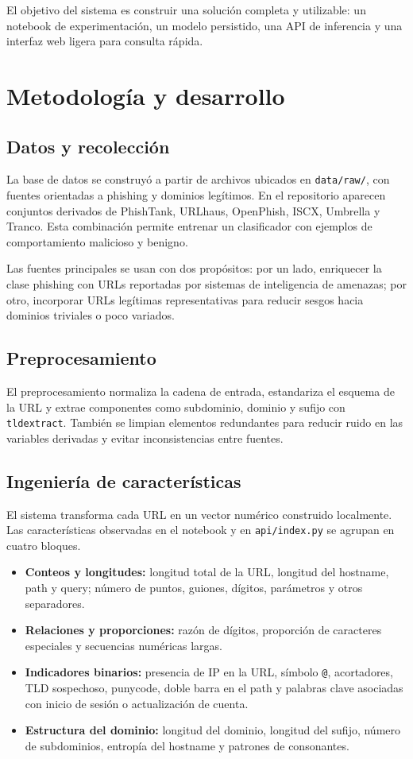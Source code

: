 \documentclass[conference]{IEEEtran}
\begin{document}
El objetivo del sistema es construir una solución completa y utilizable: un notebook de experimentación, un modelo persistido, una API de inferencia y una interfaz web ligera para consulta rápida.

\section{Metodología y desarrollo}
\subsection{Datos y recolección}
La base de datos se construyó a partir de archivos ubicados en \texttt{data/raw/}, con fuentes orientadas a phishing y dominios legítimos. En el repositorio aparecen conjuntos derivados de PhishTank, URLhaus, OpenPhish, ISCX, Umbrella y Tranco. Esta combinación permite entrenar un clasificador con ejemplos de comportamiento malicioso y benigno.

Las fuentes principales se usan con dos propósitos: por un lado, enriquecer la clase phishing con URLs reportadas por sistemas de inteligencia de amenazas; por otro, incorporar URLs legítimas representativas para reducir sesgos hacia dominios triviales o poco variados.

\subsection{Preprocesamiento}
El preprocesamiento normaliza la cadena de entrada, estandariza el esquema de la URL y extrae componentes como subdominio, dominio y sufijo con \texttt{tldextract}. También se limpian elementos redundantes para reducir ruido en las variables derivadas y evitar inconsistencias entre fuentes.

\subsection{Ingeniería de características}
El sistema transforma cada URL en un vector numérico construido localmente. Las características observadas en el notebook y en \texttt{api/index.py} se agrupan en cuatro bloques.

\begin{itemize}
    \item \textbf{Conteos y longitudes:} longitud total de la URL, longitud del hostname, path y query; número de puntos, guiones, dígitos, parámetros y otros separadores.
    \item \textbf{Relaciones y proporciones:} razón de dígitos, proporción de caracteres especiales y secuencias numéricas largas.
    \item \textbf{Indicadores binarios:} presencia de IP en la URL, símbolo \texttt{@}, acortadores, TLD sospechoso, punycode, doble barra en el path y palabras clave asociadas con inicio de sesión o actualización de cuenta.
    \item \textbf{Estructura del dominio:} longitud del dominio, longitud del sufijo, número de subdominios, entropía del hostname y patrones de consonantes.
\end{itemize}
\end{document}
